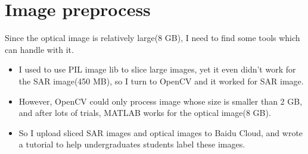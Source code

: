 \documentclass[]{IEEEtran}
\begin{document}
\section{Image preprocess}
	Since the optical image is relatively large(8 GB), I need to find some tools which can handle with it.
	\begin{itemize}
		\item I used to use PIL image lib to slice large images, yet it even didn't work for the SAR image(450 MB), so I turn to OpenCV and it worked for SAR image.
		\item However, OpenCV could only process image whose size is smaller than 2 GB, and after lots of trials, MATLAB works for the optical image(8 GB).
		\item So I upload sliced SAR images and optical images to Baidu Cloud, and wrote a tutorial to help undergraduates students label these images.
	\end{itemize}
\newpage
\end{document}
